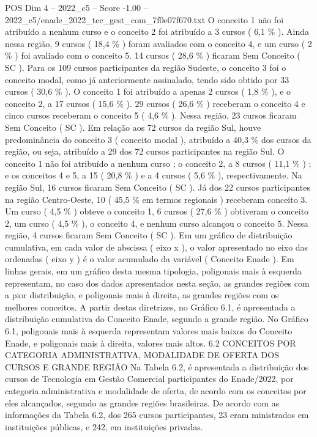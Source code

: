 \begin{textsample}{POS Dim 4 – 2022\_c5 – Score -1.00 – 2022\_c5/enade\_2022\_tec\_gest\_com\_7f0e07f670.txt}
O conceito 1 não foi atribuído a nenhum curso e o conceito 2 foi atribuído a 3 cursos ( 6,1 \% ).
Ainda nessa região, 9 cursos ( 18,4 \% ) foram avaliados com o conceito 4, e um curso ( 2 \% ) foi avaliado com o conceito 5. 14 cursos ( 28,6 \% ) ficaram Sem Conceito ( SC ).
Para os 109 cursos participantes da região Sudeste, o conceito 3 foi o conceito modal, como já anteriormente assinalado, tendo sido obtido por 33 cursos ( 30,6 \% ).
O conceito 1 foi atribuído a apenas 2 cursos ( 1,8 \% ), e o conceito 2, a 17 cursos ( 15,6 \% ). 29 cursos ( 26,6 \% ) receberam o conceito 4 e cinco cursos receberam o conceito 5 ( 4,6 \% ).
Nessa região, 23 cursos ficaram Sem Conceito ( SC ).
Em relação aos 72 cursos da região Sul, houve predominância do conceito 3 ( conceito modal ), atribuído a 40,3 \% dos cursos da região, ou seja, atribuído a 29 dos 72 cursos participantes na região Sul.
O conceito 1 não foi atribuído a nenhum curso ; o conceito 2, a 8 cursos ( 11,1 \% ) ; e os conceitos 4 e 5, a 15 ( 20,8 \% ) e a 4 cursos ( 5,6 \% ), respectivamente.
Na região Sul, 16 cursos ficaram Sem Conceito ( SC ).
Já dos 22 cursos participantes na região Centro-Oeste, 10 ( 45,5 \% em termos regionais ) receberam conceito 3.
Um curso ( 4,5 \% ) obteve o conceito 1, 6 cursos ( 27,6 \% ) obtiveram o conceito 2, um curso ( 4,5 \% ), o conceito 4, e nenhum curso alcançou o conceito 5.
Nessa região, 4 cursos ficaram Sem Conceito ( SC ).
Em um gráfico de distribuição cumulativa, em cada valor de abscissa ( eixo x ), o valor apresentado no eixo das ordenadas ( eixo y ) é o valor acumulado da variável ( Conceito Enade ).
Em linhas gerais, em um gráfico desta mesma tipologia, poligonais mais à esquerda representam, no caso dos dados apresentados nesta seção, as grandes regiões com a pior distribuição, e poligonais mais à direita, as grandes regiões com os melhores conceitos.
A partir destas diretrizes, no Gráfico 6.1, é apresentada a distribuição cumulativa do Conceito Enade, segundo a grande região.
No Gráfico 6.1, poligonais mais à esquerda representam valores mais baixos do Conceito Enade, e poligonais mais à direita, valores mais altos. 6.2 CONCEITOS POR CATEGORIA ADMINISTRATIVA, MODALIDADE DE OFERTA DOS CURSOS E GRANDE REGIÃO Na Tabela 6.2, é apresentada a distribuição dos cursos de Tecnologia em Gestão Comercial participantes do Enade/2022, por categoria administrativa e modalidade de oferta, de acordo com os conceitos por eles alcançados, segundo as grandes regiões brasileiras.
De acordo com as informações da Tabela 6.2, dos 265 cursos participantes, 23 eram ministrados em instituições públicas, e 242, em instituições privadas.

\end{textsample}
